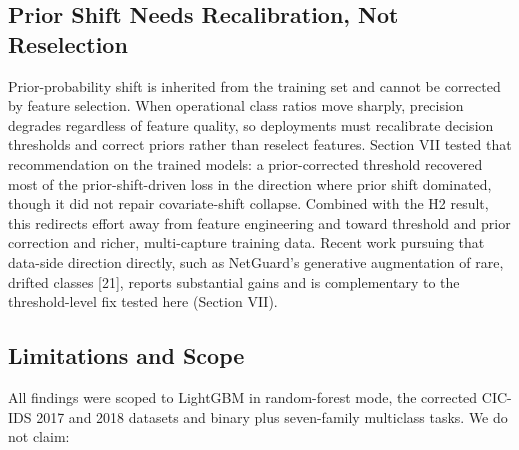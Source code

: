 \documentclass[conference]{IEEEtran}
\begin{document}
\subsection{Prior Shift Needs Recalibration, Not Reselection}

Prior-probability shift is inherited from the training set and cannot be corrected by feature selection. When operational class ratios move sharply, precision degrades regardless of feature quality, so deployments must recalibrate decision thresholds and correct priors rather than reselect features. Section VII tested that recommendation on the trained models: a prior-corrected threshold recovered most of the prior-shift-driven loss in the direction where prior shift dominated, though it did not repair covariate-shift collapse. Combined with the H2 result, this redirects effort away from feature engineering and toward threshold and prior correction and richer, multi-capture training data. Recent work pursuing that data-side direction directly, such as NetGuard's generative augmentation of rare, drifted classes [21], reports substantial gains and is complementary to the threshold-level fix tested here (Section VII).
\par\medskip

\subsection{Limitations and Scope}

All findings were scoped to LightGBM in random-forest mode, the corrected CIC-IDS 2017 and 2018 datasets and binary plus seven-family multiclass tasks. We do not claim:
\par\medskip
\end{document}
